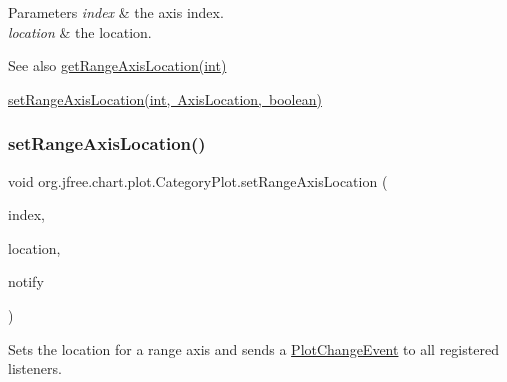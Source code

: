 \begin{DoxyParams}{Parameters}
{\em index} & the axis index. \\
\hline
{\em location} & the location.\\
\hline
\end{DoxyParams}
\begin{DoxySeeAlso}{See also}
\mbox{\hyperlink{classorg_1_1jfree_1_1chart_1_1plot_1_1_category_plot_a1f8ff2c95bc3306523a6713d0e1f6e67}{get\+Range\+Axis\+Location(int)}} 

\mbox{\hyperlink{classorg_1_1jfree_1_1chart_1_1plot_1_1_category_plot_ae55c6de25a0b27f3bbb05d8dd3391bbc}{set\+Range\+Axis\+Location(int, Axis\+Location, boolean)}} 
\end{DoxySeeAlso}
\mbox{\label{classorg_1_1jfree_1_1chart_1_1plot_1_1_category_plot_ae55c6de25a0b27f3bbb05d8dd3391bbc}} 
\subsubsection{\texorpdfstring{set\+Range\+Axis\+Location()}{setRangeAxisLocation()}\hspace{0.1cm}{\footnotesize\ttfamily [4/4]}}
{\footnotesize\ttfamily void org.\+jfree.\+chart.\+plot.\+Category\+Plot.\+set\+Range\+Axis\+Location (\begin{DoxyParamCaption}\item[{int}]{index,  }\item[{\mbox{\hyperlink{classorg_1_1jfree_1_1chart_1_1axis_1_1_axis_location}{Axis\+Location}}}]{location,  }\item[{boolean}]{notify }\end{DoxyParamCaption})}

Sets the location for a range axis and sends a \mbox{\hyperlink{}{Plot\+Change\+Event}} to all registered listeners.


